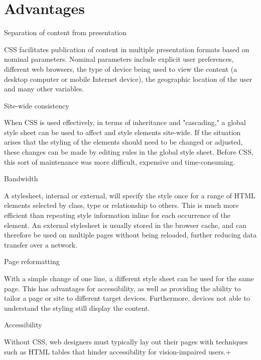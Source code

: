 \chapter{Advantages}

\begin{compactitem}
\item Separation of content from presentation

CSS facilitates publication of content in multiple presentation formats based on nominal parameters. Nominal parameters include explicit user preferences, different web browsers, the type of device being used to view the content (a desktop computer or mobile Internet device), the geographic location of the user and many other variables.


\item Site-wide consistency

When CSS is used effectively, in terms of inheritance and "cascading," a global style sheet can be used to affect and style elements site-wide. If the situation arises that the styling of the elements should need to be changed or adjusted, these changes can be made by editing rules in the global style sheet. Before CSS, this sort of maintenance was more difficult, expensive and time-consuming.

\item Bandwidth

A stylesheet, internal or external, will specify the style once for a range of HTML elements selected by class, type or relationship to others. This is much more efficient than repeating style information inline for each occurrence of the element. An external stylesheet is usually stored in the browser cache, and can therefore be used on multiple pages without being reloaded, further reducing data transfer over a network.

\item Page reformatting

With a simple change of one line, a different style sheet can be used for the same page. This has advantages for accessibility, as well as providing the ability to tailor a page or site to different target devices. Furthermore, devices not able to understand the styling still display the content.

\item Accessibility

Without CSS, web designers must typically lay out their pages with techniques such as HTML tables that hinder accessibility for vision-impaired users.+



\end{compactitem}





